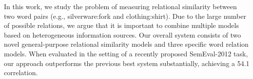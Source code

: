 In this work, we study the problem of measuring relational similarity between two word pairs (e.g., silverware:fork and clothing:shirt). Due to the large
 number of possible relations, we argue that it is important to combine multiple
 models based on heterogeneous information sources. Our overall system consists
 of two novel general-purpose relational similarity models and three specific
 word relation models. When evaluated in the setting of a recently proposed
 SemEval-2012 task, our approach outperforms the previous best system
 substantially, achieving a 54.1%
 correlation.

